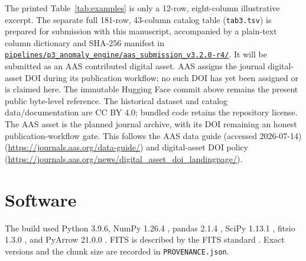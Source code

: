 \documentclass[twocolumn]{aastex701}
\begin{document}
The printed Table~\ref{tab:examples} is only a 12-row, eight-column illustrative excerpt.  The
separate full 181-row, 43-column catalog table (\texttt{tab3.tsv}) is prepared for submission with
this manuscript, accompanied by a plain-text column dictionary and SHA-256
manifest in
\href{https://github.com/Hubify-Projects/bigbounce/tree/main/pipelines/p3_anomaly_engine/aas_submission_v3.2.0-r4}{\nolinkurl{pipelines/p3_anomaly_engine/aas_submission_v3.2.0-r4/}}.  It will be submitted as an
AAS contributed digital asset.  AAS assigns the journal digital-asset DOI during its publication
workflow; no such DOI has yet been assigned or is claimed here.  The immutable Hugging Face commit
above remains the present public byte-level reference.  The historical dataset and catalog
data/documentation are CC BY 4.0; bundled code retains the repository license.  The AAS asset is
the planned journal archive, with its DOI remaining an honest publication-workflow gate.  This follows the AAS data guide (accessed 2026-07-14)
(\url{https://journals.aas.org/data-guide/}) and digital-asset DOI policy
(\url{https://journals.aas.org/news/digital_asset_doi_landingpage/}).

\section*{Software}

The build used Python 3.9.6, NumPy 1.26.4 \citep{Harris2020}, pandas 2.1.4
\citep{McKinney2010}, SciPy 1.13.1 \citep{Virtanen2020}, fitsio 1.3.0
\citep{SheldonFitsio}, and PyArrow 21.0.0 \citep{ApacheArrow}.  FITS is described by
the FITS standard \citep{Pence2010}.  Exact versions and the chunk size are recorded in
\texttt{PROVENANCE.json}.
\end{document}
